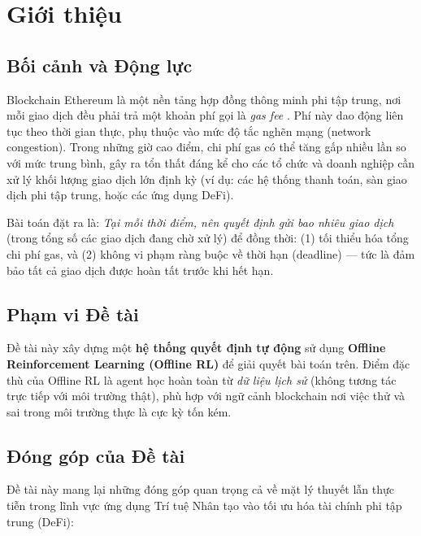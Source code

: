 \chapter*{Giới thiệu}

\section*{Bối cảnh và Động lực}

Blockchain Ethereum là một nền tảng hợp đồng thông minh phi tập trung, nơi mỗi giao dịch đều phải trả một khoản phí gọi là \textit{gas fee} \cite{ethereum2022eip1559, jang2026deep}. Phí này dao động liên tục theo thời gian thực, phụ thuộc vào mức độ tắc nghẽn mạng (network congestion). Trong những giờ cao điểm, chi phí gas có thể tăng gấp nhiều lần so với mức trung bình, gây ra tổn thất đáng kể cho các tổ chức và doanh nghiệp cần xử lý khối lượng giao dịch lớn định kỳ (ví dụ: các hệ thống thanh toán, sàn giao dịch phi tập trung, hoặc các ứng dụng DeFi).

Bài toán đặt ra là: \textit{Tại mỗi thời điểm, nên quyết định gửi bao nhiêu giao dịch} (trong tổng số các giao dịch đang chờ xử lý) để đồng thời: (1) tối thiểu hóa tổng chi phí gas, và (2) không vi phạm ràng buộc về thời hạn (deadline) — tức là đảm bảo tất cả giao dịch được hoàn tất trước khi hết hạn.

\section*{Phạm vi Đề tài}

Đề tài này xây dựng một \textbf{hệ thống quyết định tự động} sử dụng \textbf{Offline Reinforcement Learning (Offline RL)} để giải quyết bài toán trên. Điểm đặc thù của Offline RL là agent học hoàn toàn từ \textit{dữ liệu lịch sử} (không tương tác trực tiếp với môi trường thật), phù hợp với ngữ cảnh blockchain nơi việc thử và sai trong môi trường thực là cực kỳ tốn kém.

\section*{Đóng góp của Đề tài}

Đề tài này mang lại những đóng góp quan trọng cả về mặt lý thuyết lẫn thực tiễn trong lĩnh vực ứng dụng Trí tuệ Nhân tạo vào tối ưu hóa tài chính phi tập trung (DeFi):


